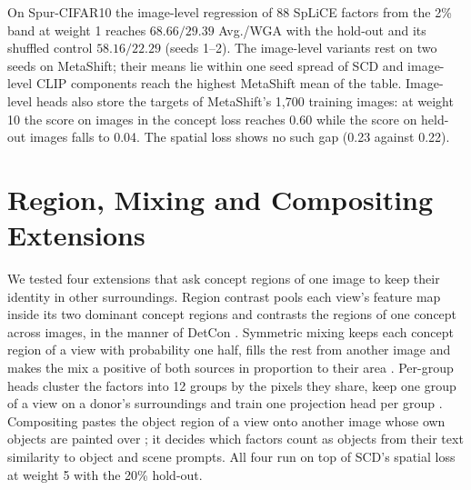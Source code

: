 \documentclass{article}
\begin{document}
On Spur-CIFAR10 the image-level regression of 88 SpLiCE factors from the 2\% band at weight 1 reaches $68.66/29.39$ Avg./WGA with the hold-out and its shuffled control $58.16/22.29$ (seeds 1--2). The image-level variants rest on two seeds on MetaShift; their means lie within one seed spread of SCD and image-level CLIP components reach the highest MetaShift mean of the table. Image-level heads also store the targets of MetaShift's 1,700 training images: at weight 10 the score on images in the concept loss reaches 0.60 while the score on held-out images falls to 0.04. The spatial loss shows no such gap (0.23 against 0.22).

\section{Region, Mixing and Compositing Extensions}
\label{app:extensions}
We tested four extensions that ask concept regions of one image to keep their identity in other surroundings. Region contrast pools each view's feature map inside its two dominant concept regions and contrasts the regions of one concept across images, in the manner of DetCon \citep{henaff2021detcon}. Symmetric mixing keeps each concept region of a view with probability one half, fills the rest from another image and makes the mix a positive of both sources in proportion to their area \citep{shen2022unmix}. Per-group heads cluster the factors into 12 groups by the pixels they share, keep one group of a view on a donor's surroundings and train one projection head per group \citep{xiao2021looc}. Compositing pastes the object region of a view onto another image whose own objects are painted over \citep{zhao2021dilo,ryali2021background}; it decides which factors count as objects from their text similarity to object and scene prompts. All four run on top of SCD's spatial loss at weight 5 with the 20\% hold-out.
\end{document}
